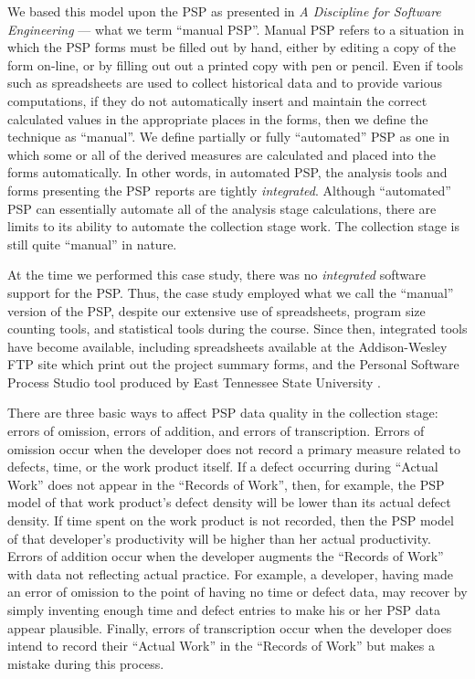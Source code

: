 We based this model upon the PSP as presented in {\it A Discipline for
  Software Engineering} \cite{Humphrey95}
--- what we term ``manual PSP''.  
Manual PSP refers to a situation in which the PSP forms must be filled out
by hand, either by editing a copy of the form on-line, or by filling out
out a printed copy with pen or pencil.  Even if tools such as spreadsheets
are used to collect historical data and to provide various computations, if
they do not automatically insert and maintain the correct calculated values
in the appropriate places in the forms, then we define the technique as
``manual''.  We define partially or fully ``automated'' PSP as one in which 
some or all of the derived measures are calculated and placed into the forms
automatically.  In other words, in automated PSP, the analysis tools and
forms presenting the PSP reports are tightly {\it integrated}. 
Although ``automated'' PSP can essentially automate all of the analysis stage
calculations, there are limits to its ability to automate the collection
stage work.  The collection stage is still quite ``manual'' in nature.

At the time we performed this case study, there was no {\em integrated}
software support for the PSP.  Thus, the case study employed what we call the
``manual'' version of the PSP, despite our extensive use of spreadsheets, program
size counting tools, and statistical tools during the course.  Since then,
integrated tools have become available, including spreadsheets available at
the Addison-Wesley FTP site which print out the project summary forms, and
the Personal Software Process Studio tool produced by East Tennessee State
University \cite{PSPS97}.

There are three basic ways to affect PSP data quality in the collection
stage: errors of omission, errors of addition, and errors of transcription.
Errors of omission occur when the developer does not record a primary
measure related to defects, time, or the work product itself.  If a defect
occurring during ``Actual Work'' does not appear in the ``Records of Work'', then, for
example, the PSP model of that work product's defect density will be lower
than its actual defect density. If time spent on the work product is not
recorded, then the PSP model of that developer's productivity will be
higher than her actual productivity. Errors of addition occur when the
developer augments the ``Records of Work'' with data not reflecting
actual practice. For example, a developer, having made an error of omission
to the point of having no time or defect data, may recover by simply
inventing enough time and defect entries to make his or her PSP data appear
plausible. Finally, errors of transcription occur when the developer does
intend to record their ``Actual Work'' in the ``Records of Work'' but makes a
mistake during this process.

